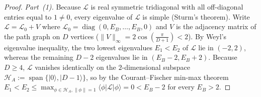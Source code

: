 \documentclass[11pt,a4paper]{article}
\numberwithin{equation}{section}
\theoremstyle{plain}
\theoremstyle{definition}
\begin{document}
\begin{proof}
\emph{Part~(1).} Because $\mathcal{L}$ is real symmetric tridiagonal with all off-diagonal entries equal to $1\ne 0$, every eigenvalue of $\mathcal{L}$ is simple (Sturm's theorem). Write $\mathcal{L} = \mathcal{L}_0 + V$ where $\mathcal{L}_0 = \operatorname{diag}(0, E_B, \dots, E_B, 0)$ and $V$ is the adjacency matrix of the path graph on $D$ vertices ($\|V\|_\infty = 2\cos(\frac{\pi}{D+1}) < 2$). By Weyl's eigenvalue inequality, the two lowest eigenvalues $E_1 < E_2$ of $\mathcal{L}$ lie in $(-2, 2)$, whereas the remaining $D-2$ eigenvalues lie in $(E_B-2, E_B+2)$. Because $D\ge 4$, $\mathcal{L}$ vanishes identically on the $2$-dimensional subspace $\mathcal{H}_A := \operatorname{span}\{|0\rangle,|D-1\rangle\}$, so by the Courant--Fischer min-max theorem $E_1 < E_2 \le \max_{\phi\in\mathcal{H}_A,\|\phi\|=1}\langle\phi|\mathcal{L}|\phi\rangle = 0 < E_B - 2$ for every $E_B > 2$.


\end{proof}
\end{document}
